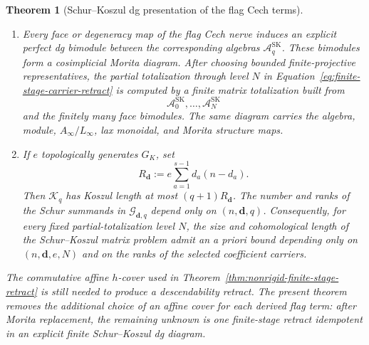 \documentclass[11pt]{article}
\newtheorem{theorem}{Theorem}[section]
\theoremstyle{definition}
\begin{document}
\begin{theorem}[Schur--Koszul dg presentation of the flag Cech terms]
\begin{enumerate}[label=\textnormal{(\roman*)}]
\item Every face or degeneracy map of the flag Cech nerve induces an explicit
perfect dg bimodule between the corresponding algebras
$\mathcal A_q^{\mathrm{SK}}$.  These bimodules form a cosimplicial Morita
diagram.  After choosing bounded finite-projective representatives, the
partial totalization through level $N$ in
Equation~\eqref{eq:finite-stage-carrier-retract} is computed by a finite
matrix totalization built from
\[
 \mathcal A_0^{\mathrm{SK}},\ldots,\mathcal A_N^{\mathrm{SK}}
\]
and the finitely many face bimodules.  The same diagram carries the algebra,
module, $A_\infty/L_\infty$, lax monoidal, and Morita structure maps.

\item If $e$ topologically generates $G_K$, set
\begin{equation}\label{eq:flag-stability-koszul-rank}
 R_{\mathbf d}
 :=e\sum_{a=1}^{s-1}d_a(n-d_a).
\end{equation}
Then $\mathcal K_q$ has Koszul length at most
$(q+1)R_{\mathbf d}$.  The number and ranks of the Schur summands in
$\mathcal G_{\mathbf d,q}$ depend only on $(n,\mathbf d,q)$.  Consequently,
for every fixed partial-totalization level $N$, the size and cohomological
length of the Schur--Koszul matrix problem admit an a priori bound depending
only on $(n,\mathbf d,e,N)$ and on the ranks of the selected coefficient
carriers.
\end{enumerate}

The commutative affine $h$-cover used in
Theorem~\ref{thm:nonrigid-finite-stage-retract} is still needed to produce a
descendability retract.  The present theorem removes the additional choice of
an affine cover for each derived flag term: after Morita replacement, the
remaining unknown is one finite-stage retract idempotent in an explicit
finite Schur--Koszul dg diagram.
\end{theorem}
\end{document}
